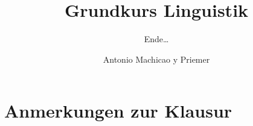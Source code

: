 
\title{Grundkurs Linguistik}

\subtitle{Ende\dots}

\author[aMyP]{
	{\small Antonio Machicao y Priemer}
}


\date{ }





\huberlintitlepage




\nocite{Altmann&Hofmann08a}
\nocite{Altmann93a}
\nocite{Brandt&Co06a}
\nocite{Glueck05a} 
\nocite{Grewendorf&Co91a} 
\nocite{Luedeling2009a} 
\nocite{Meibauer&Co07a}
\nocite{MuellerS13f} 
\nocite{MuellerS15b}
\nocite{Repp&Co15a} 
\nocite{Stechow&Sternefeld88a}
\nocite{Woellstein10a}


\section{Anmerkungen zur Klausur}

